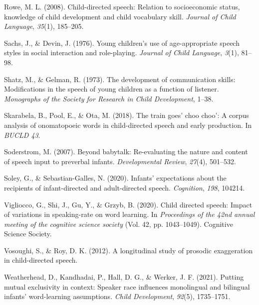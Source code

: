\documentclass[10pt, letterpaper]{article}
\newenvironment{CSLReferences}%
  {}%
  {\par}
\begin{document}
\begin{CSLReferences}{1}{0}
\leavevmode\hypertarget{ref-rowe2008child}{}%
Rowe, M. L. (2008). Child-directed speech: Relation to socioeconomic
status, knowledge of child development and child vocabulary skill.
\emph{Journal of Child Language}, \emph{35}(1), 185--205.

\leavevmode\hypertarget{ref-sachs1976young}{}%
Sachs, J., \& Devin, J. (1976). Young children's use of age-appropriate
speech styles in social interaction and role-playing. \emph{Journal of
Child Language}, \emph{3}(1), 81--98.

\leavevmode\hypertarget{ref-shatz1973development}{}%
Shatz, M., \& Gelman, R. (1973). The development of communication
skills: Modifications in the speech of young children as a function of
listener. \emph{Monographs of the Society for Research in Child
Development}, 1--38.

\leavevmode\hypertarget{ref-skarabela2018train}{}%
Skarabela, B., Pool, E., \& Ota, M. (2018). The train goes' choo choo':
A corpus analysis of onomatopoeic words in child-directed speech and
early production. In \emph{BUCLD 43}.

\leavevmode\hypertarget{ref-soderstrom2007beyond}{}%
Soderstrom, M. (2007). Beyond babytalk: Re-evaluating the nature and
content of speech input to preverbal infants. \emph{Developmental
Review}, \emph{27}(4), 501--532.

\leavevmode\hypertarget{ref-soley2020infants}{}%
Soley, G., \& Sebastian-Galles, N. (2020). Infants' expectations about
the recipients of infant-directed and adult-directed speech.
\emph{Cognition}, \emph{198}, 104214.

\leavevmode\hypertarget{ref-vigliocco2020child}{}%
Vigliocco, G., Shi, J., Gu, Y., \& Grzyb, B. (2020). Child directed
speech: Impact of variations in speaking-rate on word learning. In
\emph{Proceedings of the 42nd annual meeting of the cognitive science
society} (Vol. 42, pp. 1043--1049). Cognitive Science Society.

\leavevmode\hypertarget{ref-vosoughi2012longitudinal}{}%
Vosoughi, S., \& Roy, D. K. (2012). A longitudinal study of prosodic
exaggeration in child-directed speech.

\leavevmode\hypertarget{ref-weatherhead2021putting}{}%
Weatherhead, D., Kandhadai, P., Hall, D. G., \& Werker, J. F. (2021).
Putting mutual exclusivity in context: Speaker race influences
monolingual and bilingual infants' word-learning assumptions.
\emph{Child Development}, \emph{92}(5), 1735--1751.

\end{CSLReferences}


\end{document}
